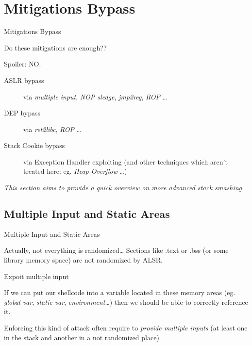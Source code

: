 \section{Mitigations Bypass}
\begin{frame}{Mitigations Bypass}

	\begin{center}\huge
	Do these mitigations are enough??
	\end{center}
	
	\begin{block}{Spoiler: NO.}
	\begin{description}
	\item[ASLR bypass] via \emph{multiple input}, \emph{NOP sledge}, \emph{jmp2reg}, \emph{ROP} \ldots
	\item[DEP bypass] via \emph{ret2libc}, \emph{ROP} \ldots
	\item[Stack Cookie bypass] via Exception Handler exploiting (and other techniques which aren't treated here: eg. \emph{Heap-Overflow} \ldots)  
	\end{description}
	\end{block}
	
	\begin{center}
	\emph{This section aims to provide a quick overview on more advanced stack smashing.}
	\end{center}
	
\end{frame}

\subsection{Multiple Input and Static Areas}
\begin{frame}{Multiple Input and Static Areas}

	\begin{block}{Actually, not everything is randomized\ldots}
	Sections like .text or .bss (or some library memory space) are not randomized by ALSR.
	\end{block}
	
	\begin{block}{Expoit multiple input}
	\begin{list}{}{}
	\item If we can put our shellcode into a variable located in these memory areas (eg. \emph{global var}, \emph{static var}, \emph{environment}\ldots) then we should be able to correctly reference it.
	\item Enforcing this kind of attack often require to \emph{provide multiple inputs} (at least one in the stack and another in a not randomized place)
	\end{list}
	\end{block}
	
\end{frame}

